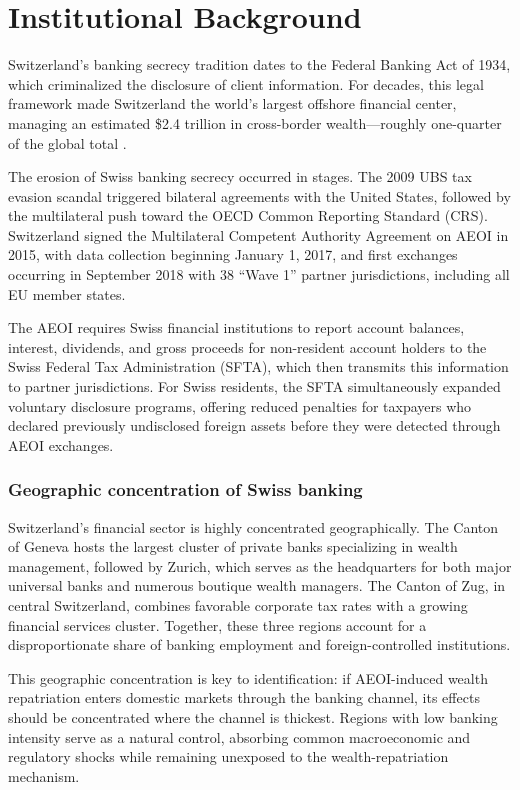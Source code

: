 \documentclass[12pt]{article}
\begin{document}
\section{Institutional Background}
\label{sec:background}

Switzerland's banking secrecy tradition dates to the Federal Banking Act of 1934, which criminalized the disclosure of client information. For decades, this legal framework made Switzerland the world's largest offshore financial center, managing an estimated \$2.4 trillion in cross-border wealth---roughly one-quarter of the global total \citep{zucman2013missing}.

The erosion of Swiss banking secrecy occurred in stages. The 2009 UBS tax evasion scandal triggered bilateral agreements with the United States, followed by the multilateral push toward the OECD Common Reporting Standard (CRS). Switzerland signed the Multilateral Competent Authority Agreement on AEOI in 2015, with data collection beginning January 1, 2017, and first exchanges occurring in September 2018 with 38 ``Wave 1'' partner jurisdictions, including all EU member states.

The AEOI requires Swiss financial institutions to report account balances, interest, dividends, and gross proceeds for non-resident account holders to the Swiss Federal Tax Administration (SFTA), which then transmits this information to partner jurisdictions. For Swiss residents, the SFTA simultaneously expanded voluntary disclosure programs, offering reduced penalties for taxpayers who declared previously undisclosed foreign assets before they were detected through AEOI exchanges.

\subsubsection*{Geographic concentration of Swiss banking} Switzerland's financial sector is highly concentrated geographically. The Canton of Geneva hosts the largest cluster of private banks specializing in wealth management, followed by Zurich, which serves as the headquarters for both major universal banks and numerous boutique wealth managers. The Canton of Zug, in central Switzerland, combines favorable corporate tax rates with a growing financial services cluster. Together, these three regions account for a disproportionate share of banking employment and foreign-controlled institutions.

This geographic concentration is key to identification: if AEOI-induced wealth repatriation enters domestic markets through the banking channel, its effects should be concentrated where the channel is thickest. Regions with low banking intensity serve as a natural control, absorbing common macroeconomic and regulatory shocks while remaining unexposed to the wealth-repatriation mechanism.
\end{document}
